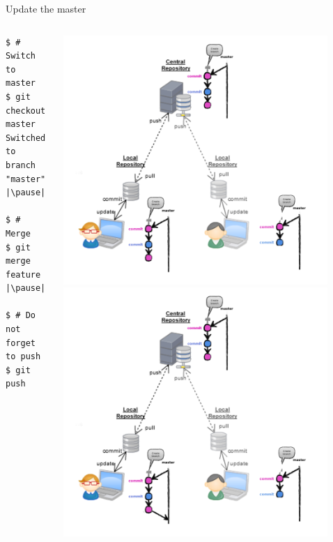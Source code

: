 \begin{frame}[fragile]{Update the master}
\begin{columns}
	\begin{column}{0.6\textwidth}
  	\begin{lstlisting}
$ # Switch to master
$ git checkout master
Switched to branch "master" |\pause|

$ # Merge
$ git merge feature |\pause|

$ # Do not forget to push
$ git push
	\end{lstlisting}
	\end{column}
	\begin{column}{0.4\textwidth}
		\begin{center}
			 {
				\includegraphics[width=0.9\textwidth]{multiuser_my_many_commits_pushed.png}
			}\only<2> {
				\includegraphics[width=0.9\textwidth]{multiuser_my_merge.png}
}
\end{center}
\end{column}
\end{columns}
\end{frame}
